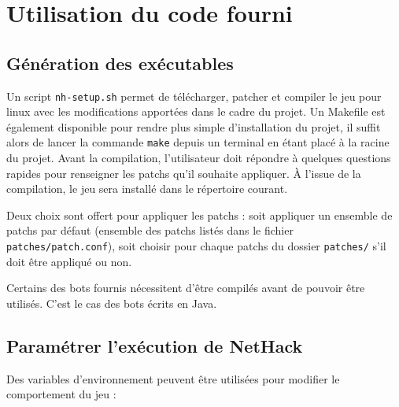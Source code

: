 \documentclass[10pt,a4paper]{report}
\begin{document}
\tableofcontents

\chapter{Utilisation du code fourni}
\section{Génération des exécutables}

Un script \verb!nh-setup.sh! permet de télécharger, patcher et compiler le jeu
pour linux avec les modifications apportées dans le cadre du projet. Un
Makefile est également disponible pour rendre plus simple d'installation du
projet, il suffit alors de lancer la commande \verb!make! depuis un terminal
en étant placé à la racine du projet.
Avant la compilation, l'utilisateur doit répondre à quelques questions rapides
pour renseigner les patchs qu'il souhaite appliquer. À l'issue de la
compilation, le jeu sera installé dans le répertoire courant.

Deux choix sont offert pour appliquer les patchs : soit appliquer un ensemble
de patchs par défaut (ensemble des patchs listés dans le fichier
\verb!patches/patch.conf!), soit choisir pour chaque patchs du dossier
\verb!patches/! s'il doit être appliqué ou non.

Certains des bots fournis nécessitent d'être compilés avant de pouvoir être
utilisés. C'est le cas des bots écrits en Java.

\section{Paramétrer l'exécution de NetHack}

Des variables d'environnement peuvent être utilisées pour modifier le
comportement du jeu :
\end{document}
